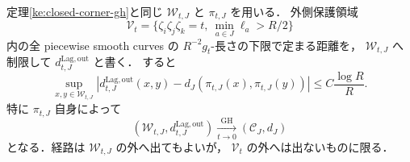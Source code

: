 \begin{corollary}[外側保護領域を通る距離に関する同じ極限]
\label{ke:closed-corner-protected-gh}
定理\ref{ke:closed-corner-gh}と同じ $\mathcal W_{t,J}$ と $\pi_{t,J}$ を用いる．
外側保護領域
\[
 \mathcal V_t
 =\{\zeta_i\zeta_j\zeta_k=t,\ \min_{a\in J}\ell_a>R/2\}
\]
内の全 piecewise smooth curves の $R^{-2}g_t$-長さの下限で定まる距離を，
$\mathcal W_{t,J}$ へ制限して $d_{t,J}^{\mathrm{Lag,out}}$ と書く．
すると
\begin{equation}\label{ke:eq:closed-corner-protected-distortion}
 \sup_{x,y\in\mathcal W_{t,J}}
 \left|d_{t,J}^{\mathrm{Lag,out}}(x,y)
      -d_J(\pi_{t,J}(x),\pi_{t,J}(y))\right|
 \le C\frac{\log R}{R}.
\end{equation}
特に $\pi_{t,J}$ 自身によって
\[
 (\mathcal W_{t,J},d_{t,J}^{\mathrm{Lag,out}})
 \xrightarrow[t\to0]{\mathrm{GH}}(\mathcal C_J,d_J)
\]
となる．経路は $\mathcal W_{t,J}$ の外へ出てもよいが，
$\mathcal V_t$ の外へは出ないものに限る．
\end{corollary}
